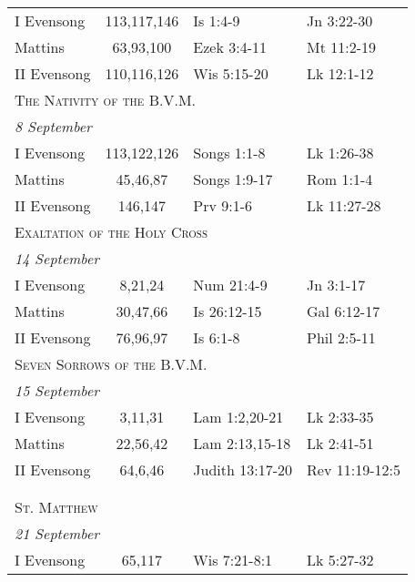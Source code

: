 \begin{longtable}{l c l l}
\hspace{1em} I Evensong&113,117,146&Is 1:4-9&Jn 3:22-30\\
\hspace{1em} Mattins&63,93,100&Ezek 3:4-11&Mt 11:2-19\\
\hspace{1em} II Evensong&110,116,126&Wis 5:15-20&Lk 12:1-12\\
%
\multicolumn{4}{l}{\textsc{The Nativity of the B.V.M.}}\\
\multicolumn{4}{l}{\textit{8 September}}\\
\hspace{1em} I Evensong&113,122,126&Songs 1:1-8&Lk 1:26-38\\
\hspace{1em} Mattins&45,46,87&Songs 1:9-17&Rom 1:1-4\\
\hspace{1em} II Evensong&146,147&Prv 9:1-6&Lk 11:27-28\\
%
\multicolumn{4}{l}{\textsc{Exaltation of the Holy Cross}}\\
\multicolumn{4}{l}{\textit{14 September}}\\
\hspace{1em} I Evensong&8,21,24&Num 21:4-9&Jn 3:1-17\\
\hspace{1em} Mattins&30,47,66&Is 26:12-15&Gal 6:12-17\\
\hspace{1em} II Evensong&76,96,97&Is 6:1-8&Phil 2:5-11\\
%
\multicolumn{4}{l}{\textsc{Seven Sorrows of the B.V.M.}}\\
\multicolumn{4}{l}{\textit{15 September}}\\
\hspace{1em} I Evensong&3,11,31&Lam 1:2,20-21&Lk 2:33-35\\
\hspace{1em} Mattins&22,56,42&Lam 2:13,15-18&Lk 2:41-51\\
\hspace{1em} II Evensong&64,6,46&Judith 13:17-20&Rev 11:19-12:5\\
\\
\\
\multicolumn{4}{l}{\textsc{St. Matthew}}\\
\multicolumn{4}{l}{\textit{21 September}}\\
\hspace{1em} I Evensong&65,117&Wis 7:21-8:1&Lk 5:27-32\\

\end{longtable}
